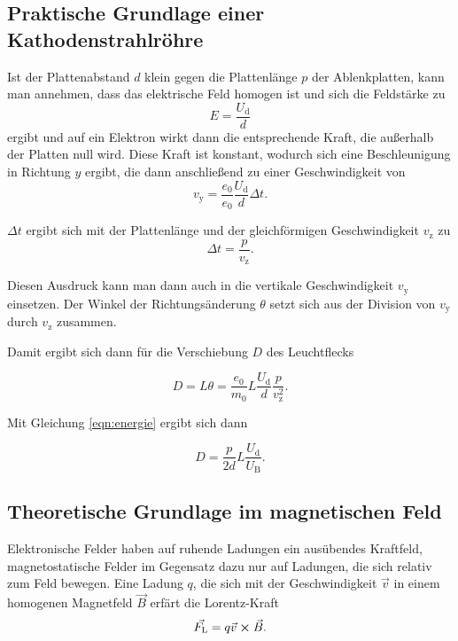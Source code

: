 \subsection{Praktische Grundlage einer Kathodenstrahlröhre}

Ist der Plattenabstand $d$ klein gegen die Plattenlänge $p$ der Ablenkplatten, kann man annehmen, dass das elektrische Feld homogen ist und sich die Feldstärke zu 
\begin{equation*}
    E = \frac{U_\text{d}}{d}
\end{equation*} 
ergibt und auf ein Elektron wirkt dann die entsprechende Kraft, die außerhalb der Platten null wird. Diese Kraft ist konstant, wodurch sich eine Beschleunigung in Richtung $y$ ergibt, die dann anschließend zu einer Geschwindigkeit von 
\begin{equation*}
    v_\text{y} = \frac{e_\text{0}}{e_\text{0}} \frac{U_\text{d}}{d} \Delta t.
\end{equation*}

$\Delta t$ ergibt sich mit der Plattenlänge und der gleichförmigen Geschwindigkeit $v_\text{z}$ zu 
\begin{equation*}
    \Delta t = \frac{p}{v_\text{z}}.
\end{equation*}

Diesen Ausdruck kann man dann auch in die vertikale Geschwindigkeit $v_\text{y}$ einsetzen. Der Winkel der Richtungsänderung $\theta$ setzt sich aus der Division von $v_\text{y}$ durch $v_\text{z}$ zusammen. 

Damit ergibt sich dann für die Verschiebung $D$ des Leuchtflecks 

\begin{equation}
    D = L \theta = \frac{e_\text{0}}{m_\text{0}} L \frac{U_\text{d}}{d} \frac{p}{v_\text{z}^2}.
\end{equation}

Mit Gleichung \eqref{eqn:energie} ergibt sich dann 

\begin{equation}
    D = \frac{p}{2d} L \frac{U_\text{d}}{U_\text{B}}.
    \label{eqn:leuchtfleck}
\end{equation}



\subsection{Theoretische Grundlage im magnetischen Feld}
Elektronische Felder haben auf ruhende Ladungen ein ausübendes Kraftfeld, magnetostatische Felder im Gegensatz dazu nur auf Ladungen, die sich relativ zum Feld bewegen. 
Eine Ladung $q$, die sich mit der Geschwindigkeit $\vec{v}$ in einem homogenen Magnetfeld $\vec{B}$ erfärt die Lorentz-Kraft 
\begin{equation}
    \vec{F_\text{L}}= q \vec{v} \cross \vec{B}.
    \label{eqn:Lorentz}
\end{equation}

